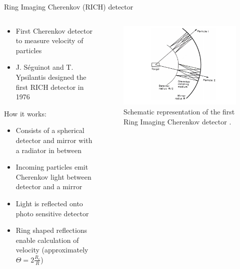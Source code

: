 \documentclass[aspectratio=1610, 10pt]{beamer}
\begin{document}
\begin{frame}{Ring Imaging Cherenkov (RICH) detector}
  \begin{columns}
  \begin{column}{0.5\textwidth}
  \begin{itemize}
    \item First Cherenkov detector to measure velocity of particles
    \medskip
    \item J. S\'{e}guinot and T. Ypsilantis designed the first RICH detector in 1976
  \end{itemize}
\vspace{0.5cm}
How it works:
\begin{itemize}
  \item Consists of a spherical detector and mirror with a radiator in between
  \medskip
  \item Incoming particles emit Cherenkov light between detector and a mirror
  \medskip
  \item Light is reflected onto photo sensitive detector
  \medskip
  \item Ring shaped reflections enable calculation of velocity (approximately $\Theta = 2 \frac{R_c}{R}$)
\end{itemize}
\end{column}
\begin{column}{0.5\textwidth}
  \begin{figure}
    \includegraphics[width=1\textwidth]{images/rich.png}
    \caption{Schematic representation of the first Ring Imaging Cherenkov detector \cite{gaseous}.}
  \end{figure}
\end{column}
\end{columns}
\end{frame}
\end{document}
